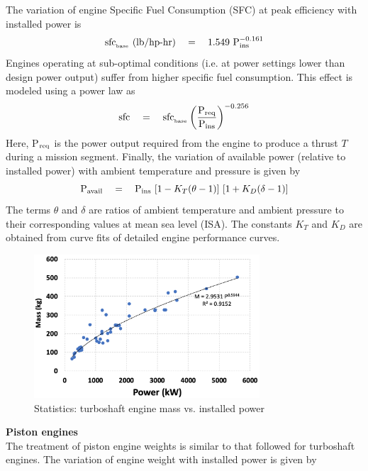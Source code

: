 The variation of engine Specific Fuel Consumption (SFC) at peak efficiency with installed power is 
\begin{equation}
\textrm{sfc}_{_{\rm base}} \textrm{ } (\textrm{lb/hp-hr}) \quad = \quad 1.549 \textrm{ P}_{\rm ins}^{-0.161}
\end{equation}
Engines operating at sub-optimal conditions (i.e. at power settings lower than design power output) suffer from higher specific fuel consumption. This effect is modeled using a power law as 
\begin{equation}
\label{eqn:sfcpower}
\textrm{sfc} \quad = \quad \textrm{sfc}_{_{\rm base}} \left(\frac{\textrm{P}_{\rm req}}{\textrm{P}_{\rm ins}}\right)^{-0.256}
\end{equation}
Here, P$_{\rm req}$ is the power output required from the engine to produce a thrust $T$ during a mission segment. Finally, the variation of available power (relative to installed power) with ambient temperature and pressure is given by 
\begin{equation}
\textrm{P}_{\rm avail} \quad = \quad \textrm{P}_{\rm ins} \textrm{ } [1 - K_T (\theta-1)] \textrm{ } [1 + K_D (\delta-1)]
\end{equation}
The terms $\theta$ and $\delta$ are ratios of ambient temperature and ambient pressure to their corresponding values at mean sea level (ISA). The constants $K_T$ and $K_D$ are obtained from curve fits of detailed engine performance curves. \\
\begin{figure}
\begin{center}
\includegraphics[width=0.75\textwidth]{images/turboshaft.png}
\vspace{-0.1cm}
\caption{Statistics: turboshaft engine mass vs. installed power}
\label{fig:turboshaft}
\end{center}
\end{figure}
\textbf{Piston engines} \\
The treatment of piston engine weights is similar to that followed for turboshaft engines. The variation of engine weight with installed power is given by 

